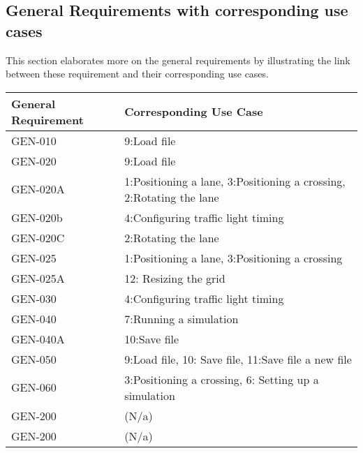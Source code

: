 
\subsection{General Requirements with corresponding use cases}
This section elaborates more on the general requirements by illustrating the link between these requirement and their corresponding use cases. 

\begin{tabularx}{\textwidth}{|p{4cm}|X|}\hline
	\textbf{General Requirement} & \textbf{Corresponding Use Case }\\\hline
	GEN-010&9:Load file\\ \hline
	GEN-020&9:Load file\\ \hline
	GEN-020A&1:Positioning a lane, 3:Positioning a crossing, 2:Rotating the lane \\ \hline
	GEN-020b&4:Configuring traffic light timing\\ \hline
	GEN-020C&2:Rotating the lane \\ \hline
	GEN-025&1:Positioning a lane, 3:Positioning a crossing\\ \hline
	GEN-025A&12: Resizing the grid \\ \hline
	GEN-030&4:Configuring traffic light timing\\ \hline
	GEN-040&7:Running a simulation\\ \hline
	GEN-040A&10:Save file\\ \hline
	GEN-050&9:Load file, 10: Save file, 11:Save file a new file\\ \hline
	GEN-060&3:Positioning a crossing, 6: Setting up a simulation\\ \hline
	GEN-200& (N/a)\\ \hline
	GEN-200& (N/a)\\ \hline

\end{tabularx}

